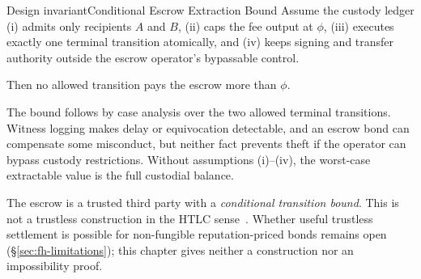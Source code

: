 \documentclass[11pt,a4paper]{article}
\theoremstyle{definition}
\theoremstyle{remark}
\begin{document}
\begin{pdclaim}{Design invariant}{Conditional Escrow Extraction Bound}
\setlength{\parskip}{4pt plus 1pt}
\label{thm:fh-escrow-bound}
Assume the custody ledger (i) admits only recipients $A$ and $B$, (ii) caps the fee output at $\phi$, (iii) executes exactly one terminal transition atomically, and (iv) keeps signing and transfer authority outside the escrow operator's bypassable control. 

Then no allowed transition pays the escrow more than $\phi$.
\end{pdclaim}

The bound follows by case analysis over the two allowed terminal transitions. Witness logging makes delay or equivocation detectable, and an escrow bond can compensate some misconduct, but neither fact prevents theft if the operator can bypass custody restrictions. Without assumptions (i)--(iv), the worst-case extractable value is the full custodial balance.

The escrow is a trusted third party with a \emph{conditional transition bound}. This is not a trustless construction in the HTLC sense~. Whether useful trustless settlement is possible for non-fungible reputation-priced bonds remains open (\S\ref{sec:fh-limitations}); this chapter gives neither a construction nor an impossibility proof.
\end{document}
